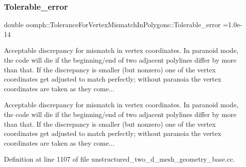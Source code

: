 \subsubsection{\texorpdfstring{Tolerable\+\_\+error}{Tolerable\_error}}
{\footnotesize\ttfamily double oomph\+::\+Tolerance\+For\+Vertex\+Mismatch\+In\+Polygons\+::\+Tolerable\+\_\+error =1.\+0e-\/14}



Acceptable discrepancy for mismatch in vertex coordinates. In paranoid mode, the code will die if the beginning/end of two adjacent polylines differ by more than that. If the discrepancy is smaller (but nonzero) one of the vertex coordinates get adjusted to match perfectly; without paranoia the vertex coordinates are taken as they come... 

Acceptable discrepancy for mismatch in vertex coordinates. In paranoid mode, the code will die if the beginning/end of two adjacent polylines differ by more than that. If the discrepancy is smaller (but nonzero) one of the vertex coordinates get adjusted to match perfectly; without paranoia the vertex coordinates are taken as they come... 

Definition at line 1107 of file unstructured\+\_\+two\+\_\+d\+\_\+mesh\+\_\+geometry\+\_\+base.\+cc.



